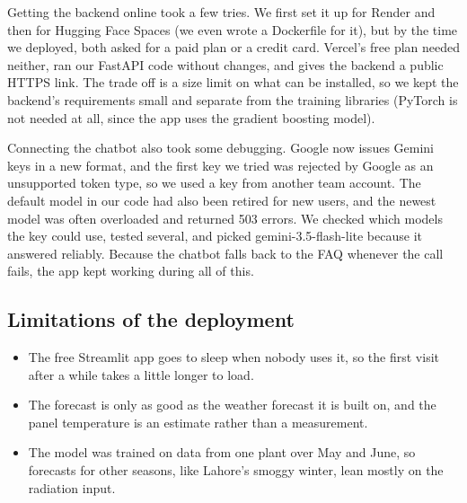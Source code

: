Getting the backend online took a few tries. We first set it up for Render and then for Hugging Face Spaces (we even wrote a Dockerfile for it), but by the time we deployed, both asked for a paid plan or a credit card. Vercel's free plan needed neither, ran our FastAPI code without changes, and gives the backend a public HTTPS link. The trade off is a size limit on what can be installed, so we kept the backend's requirements small and separate from the training libraries (PyTorch is not needed at all, since the app uses the gradient boosting model).

Connecting the chatbot also took some debugging. Google now issues Gemini keys in a new format, and the first key we tried was rejected by Google as an unsupported token type, so we used a key from another team account. The default model in our code had also been retired for new users, and the newest model was often overloaded and returned 503 errors. We checked which models the key could use, tested several, and picked gemini-3.5-flash-lite because it answered reliably. Because the chatbot falls back to the FAQ whenever the call fails, the app kept working during all of this.

\subsection{Limitations of the deployment}

\begin{itemize}
    \item The free Streamlit app goes to sleep when nobody uses it, so the first visit after a while takes a little longer to load.
    \item The forecast is only as good as the weather forecast it is built on, and the panel temperature is an estimate rather than a measurement.
    \item The model was trained on data from one plant over May and June, so forecasts for other seasons, like Lahore's smoggy winter, lean mostly on the radiation input.
\end{itemize}